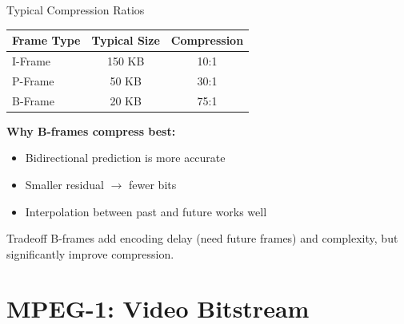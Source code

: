 \documentclass[aspectratio=169,12pt]{beamer}
\begin{document}
\begin{frame}{Typical Compression Ratios}
    \begin{center}
        \begin{tabular}{l|c|c}
            \toprule
            \textbf{Frame Type} & \textbf{Typical Size} & \textbf{Compression} \\
            \midrule
            I-Frame & 150 KB & 10:1 \\
            P-Frame & 50 KB & 30:1 \\
            B-Frame & 20 KB & 75:1 \\
            \bottomrule
        \end{tabular}
    \end{center}
    
    \vspace{0.3cm}
    \textbf{Why B-frames compress best:}
    \begin{itemize}
        \item Bidirectional prediction is more accurate
        \item Smaller residual $\rightarrow$ fewer bits
        \item Interpolation between past and future works well
    \end{itemize}
    
    \vspace{0.3cm}
    \begin{alertblock}{Tradeoff}
        B-frames add encoding delay (need future frames) and complexity, but significantly improve compression.
    \end{alertblock}
\end{frame}


\section{MPEG-1: Video Bitstream}
\end{document}
